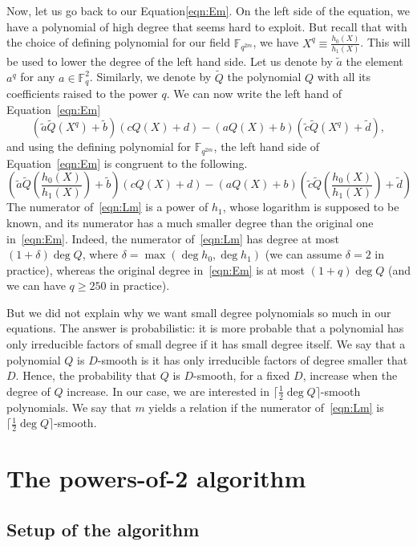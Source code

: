 \documentclass[a4paper,11pt]{article}
\theoremstyle{break}
\theoremstyle{sc}
\theoremstyle{definition}
\theoremstyle{remark}
\begin{document}
Now, let us go back to our Equation\eqref{eqn:Em}. On the left side of the equation, we have a polynomial of high degree that seems
hard to exploit. But recall that with the choice of defining polynomial for our
field $\mathbb{F}_{q^{2m}}$, we have $X^q \equiv \frac{h_0(X)}{h_1(X)}$. This will
be used to lower the degree of the left hand side. Let us denote by $\tilde a$
the element $a^q$ for any $a\in\mathbb{F}_q^2$. Similarly, we denote by
$\widetilde Q$ the polynomial $Q$ with all its coefficients raised to the power
$q$. We can now write the left hand of Equation~\eqref{eqn:Em}
\[
  (\tilde a \widetilde Q (X^q)+\tilde b)(cQ(X)+d)-(aQ(X)+b)(\tilde c\widetilde
  Q(X^q)+\tilde d),
\]
and using the defining polynomial for $\mathbb{F}_{q^{2m}}$, the left hand side of
Equation~\eqref{eqn:Em} is congruent to the following.
\begin{equation}
  \tag{$\mathcal L_m$}
  \left(\tilde a \widetilde Q \left(\frac{h_0(X)}{h_1(X)}\right)+\tilde
  b\right)(cQ(X)+d)-(aQ(X)+b)\left(\tilde c\widetilde
  Q\left(\frac{h_0(X)}{h_1(X)}\right)+\tilde d\right)
  \label{eqn:Lm}
\end{equation}
The numerator of~\eqref{eqn:Lm} is a power of $h_1$, whose logarithm is supposed
to be known, and its numerator has a much smaller degree than the original one
in~\eqref{eqn:Em}. Indeed, the numerator of~\eqref{eqn:Lm} has degree at most
$(1+\delta)\deg Q$, where $\delta=\max(\deg h_0, \deg h_1)$ (we can assume
$\delta=2$ in practice), whereas the original degree in~\eqref{eqn:Em} is at
most $(1+q)\deg Q$ (and we can have $q\geq 250$ in practice).

But we did not explain why we want small degree polynomials so much in our
equations. The answer is probabilistic: it is more probable that a polynomial
has only irreducible factors of small degree if it has small degree itself. We
say that a polynomial $Q$ is $D$-smooth is it has only irreducible factors of
degree smaller that $D$. Hence, the probability that $Q$ is $D$-smooth, for a
fixed $D$, increase when the degree of $Q$ increase. In our case, we are
interested in $\lceil\frac{1}{2}\deg Q\rceil$-smooth polynomials. We say that
$m$ yields a relation if the numerator of~\eqref{eqn:Lm} is
$\lceil\frac{1}{2}\deg Q\rceil$-smooth. 

\section{The powers-of-2 algorithm}
\label{powers-of-2}
\subsection{Setup of the algorithm}
\end{document}
